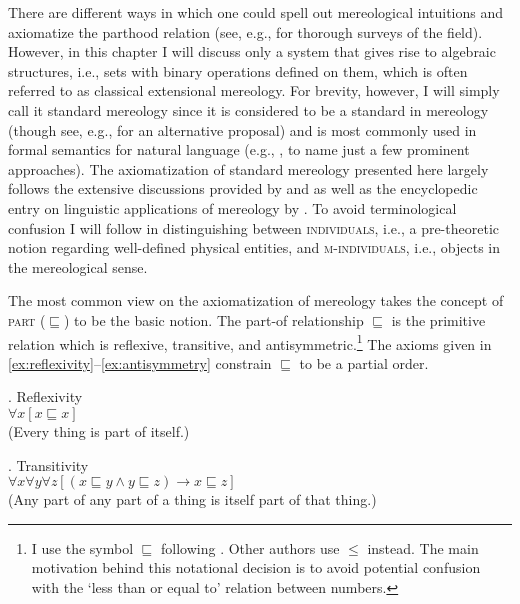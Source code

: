 There are different ways in which one could spell out mereological intuitions and axiomatize the parthood relation (see, e.g., \citealt{simons1987parts,casati_varzi1999parts,varzi2016mereology} for thorough surveys of the field). However, in this chapter I will discuss only a system that gives rise to algebraic structures, i.e., sets with binary operations defined on them, which is often referred to as classical extensional mereology. For brevity, however, I will simply call it standard mereology since it is considered to be a standard in mereology (though see, e.g., \citealt{rescher1955axioms} for an alternative proposal) and is most commonly used in formal semantics for natural language (e.g., \citealt{link1983logical,krifka1989nominal,landman2000events,champollion2017parts}, to name just a few prominent approaches). The axiomatization of standard mereology presented here largely  follows the extensive discussions provided by \citet{simons1987parts} and \citet{casati_varzi1999parts} as well as the encyclopedic entry on linguistic applications of mereology by \citet{champollion_krifka2016mereology}. To avoid terminological confusion I will follow \citet{grimm2012number} in distinguishing between \textsc{individuals}, i.e., a pre-theoretic notion regarding well-defined physical entities, and \textsc{m-individuals}, i.e., objects in the mereological sense.

The most common view on the axiomatization of mereology takes the concept of \textsc{part} ($\sqsubseteq$) to be the basic notion. The part-of relationship $\sqsubseteq$ is the primitive relation which is reflexive, transitive, and antisymmetric.\footnote{I use the symbol $\sqsubseteq$ following \citet{landman1989groupsi,landman1989groupsii,landman2000events}. Other authors use $\leq$ instead. The main motivation behind this notational decision is to avoid potential confusion with the `less than or equal to' relation between numbers.} The axioms given in \ref{ex:reflexivity}--\ref{ex:antisymmetry} constrain $\sqsubseteq$ to be a partial order.

\ex. Reflexivity \citep[p. 515; adapted]{champollion_krifka2016mereology}\label{ex:reflexivity}\\
{$\forall x[x\sqsubseteq x]$}\\
(Every thing is part of itself.)

\ex. Transitivity \citep[p. 516; adapted]{champollion_krifka2016mereology}\label{ex:transitivity}\\
{$\forall x\forall y\forall z[(x\sqsubseteq y \wedge y\sqsubseteq z) \rightarrow x\sqsubseteq z]$}\\
(Any part of any part of a thing is itself part of that thing.)

